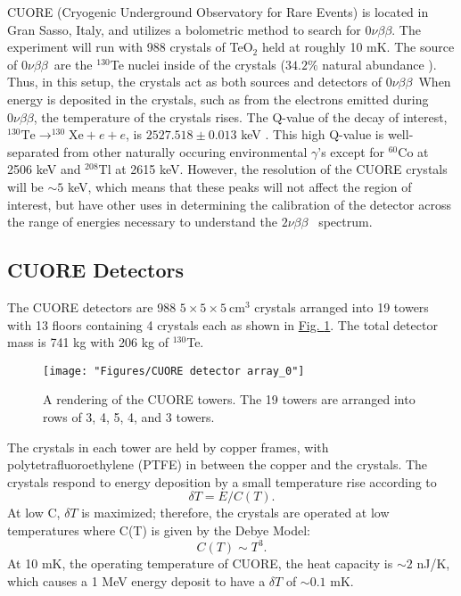 \documentclass[12pt,a4paper]{article}
\newcommand{\zeronubb}{$0\nu \beta \beta$}
\newcommand{\twonubb}{$2\nu \beta \beta$}
\begin{document}
CUORE (Cryogenic Underground Observatory for Rare Events) is located in Gran Sasso, Italy, and utilizes a bolometric method to search for \zeronubb. The experiment will run with 988 crystals of TeO$_2$ held at roughly 10 mK. The source of \zeronubb~are the $^{130}$Te nuclei inside of the crystals ($34.2\%$ natural abundance \cite{Fehr200483}). Thus, in this setup, the crystals act as both sources and detectors of \zeronubb~When energy is deposited in the crystals, such as from the electrons emitted during \zeronubb, the temperature of the crystals rises. The Q-value of the decay of interest, $^{130}\textrm{Te} \rightarrow ^{130}\textrm{Xe} + e + e$, is $2527.518\pm 0.013$ keV \cite{Redshaw:2009cf}\cite{Scielzo:2009nh}\cite{Rahaman:2011zz}. This high Q-value is well-separated from other naturally occuring environmental $\gamma$'s except for $^{60}$Co at 2506 keV and $^{208}$Tl at 2615 keV. However, the resolution of the CUORE crystals will be $\sim5$ keV, which means that these peaks will not affect the region of interest, but have other uses in determining the calibration of the detector across the range of energies necessary to understand the \twonubb~ spectrum.

\subsection{CUORE Detectors}

The CUORE detectors are 988 $ 5\times 5 \times 5~ \textrm{cm}^3$ crystals arranged into 19 towers with 13 floors containing 4 crystals each as shown in \hyperref[fig:cuore-detector-array0]{Fig. \ref*{fig:cuore-detector-array0}}. The total detector mass is 741 kg with 206 kg of $^{130}$Te. 

\begin{figure}[htbp]
\centering
\texttt{[image: "Figures/CUORE detector array\_0"]}
\caption{A rendering of the CUORE towers. The 19 towers are arranged into rows of 3, 4, 5, 4, and 3 towers.}
\label{fig:cuore-detector-array0}
\end{figure}


The crystals in each tower are held by copper frames, with polytetrafluoroethylene (PTFE) in between the copper and the crystals. The crystals respond to energy deposition by a small temperature rise according to
\begin{equation}
\delta T = E/C(T).
\end{equation}
At low C, $\delta T$ is maximized; therefore, the crystals are operated at low temperatures where C(T) is given by the Debye Model:
\begin{equation}
C(T)\sim T^3.
\end{equation}
At 10 mK, the operating temperature of CUORE, the heat capacity is $\sim2$ nJ/K, which causes a 1 MeV energy deposit to have a $\delta T$ of $\sim0.1$ mK.
\end{document}
